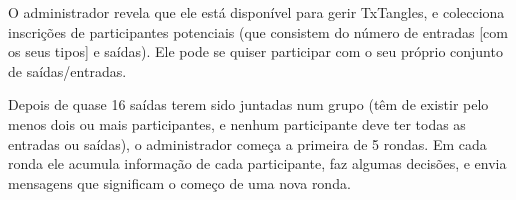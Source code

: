 O administrador revela que ele está disponível para gerir TxTangles, e colecciona inscrições de participantes potenciais (que consistem do número de entradas [com os seus tipos] e saídas). Ele pode se quiser participar com o seu próprio conjunto de saídas/entradas.

Depois de quase 16 saídas terem sido juntadas num grupo (têm de existir pelo menos dois ou mais participantes, e nenhum participante deve ter todas as entradas ou saídas), o administrador começa a primeira de 5 rondas. Em cada ronda ele acumula informação de cada participante, faz algumas decisões, e envia mensagens que significam o começo de uma nova ronda.
